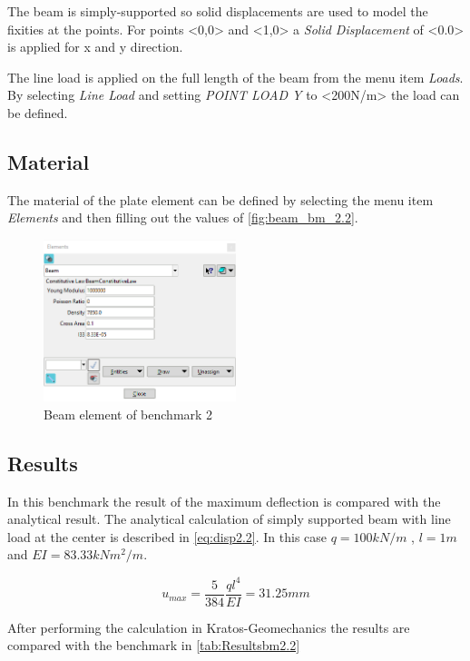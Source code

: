 \documentclass{deltares_manual_style}
\begin{document}
The beam is simply-supported so solid displacements are used to model the fixities at the points. For points <0,0> and 
<1,0> a \textit{Solid Displacement} of <0.0> is applied for x and y direction. 

The line load is applied on the full length of the beam from the menu item \textit{Loads}. By selecting \textit{Line Load} and 
setting \textit{POINT LOAD Y} to <200N/m> the load can be defined.  
 
\subsection{Material}
The material of the plate element can be defined by selecting the menu item \textit{Elements} and then filling out the 
values of \autoref{fig:beam_bm_2.2}.

\begin{figure}[h]
	\centering
		\includegraphics[width=0.50\textwidth]{figures/beam_bm_2_2.png}
	\caption{Beam element of benchmark 2}
	\label{fig:beam_bm_2.2}
\end{figure}

\subsection{Results} 
In this benchmark the result of the maximum deflection is compared with the analytical result. The analytical
calculation of simply supported beam with line load at the center is described in \autoref{eq:disp2.2}. In this case $q = 100kN/m$ , $l = 1m$ and $EI = 83.33 kNm^{2}/m$.

\begin{equation}\label{eq:disp2.2}
u_{max} = \frac{5}{ 384} \frac{q l^{4}}{EI} = 31.25mm
\end{equation}

After performing the calculation in Kratos-Geomechanics the results are compared with the benchmark in \autoref{tab:Resultsbm2.2} 
\end{document}
